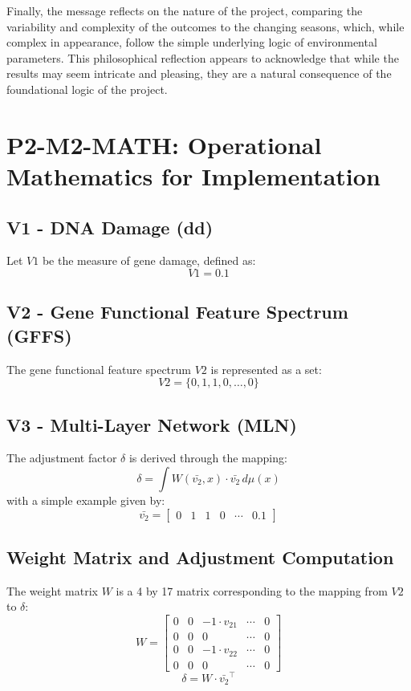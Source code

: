 \documentclass{article}
\begin{document}
Finally, the message reflects on the nature of the project, comparing the variability and complexity of the outcomes to the changing seasons, which, while complex in appearance, follow the simple underlying logic of environmental parameters. This philosophical reflection appears to acknowledge that while the results may seem intricate and pleasing, they are a natural consequence of the foundational logic of the project.



\section*{P2-M2-MATH: Operational Mathematics for Implementation}

\subsection*{V1 - DNA Damage (dd)}
Let $V1$ be the measure of gene damage, defined as:
\begin{equation}
V1 = 0.1
\end{equation}

\subsection*{V2 - Gene Functional Feature Spectrum (GFFS)}
The gene functional feature spectrum $V2$ is represented as a set:
\begin{equation}
V2 = \{0,1, 1,0, \ldots, 0\}
\end{equation}

\subsection*{V3 - Multi-Layer Network (MLN)}
The adjustment factor $\delta$ is derived through the mapping:
\begin{equation}
\delta = \int W(\bar{v_2},x) \cdot \bar{v_2} \, d\mu(x)
\end{equation}
with a simple example given by:
\begin{equation}
\bar{v_2} = 
\begin{bmatrix}
0 & 1 & 1 & 0 & \cdots & 0.1
\end{bmatrix}
\end{equation}

\subsection*{Weight Matrix and Adjustment Computation}
The weight matrix $W$ is a 4 by 17 matrix corresponding to the mapping from $V2$ to $\delta$:
\begin{equation}
W = 
\begin{bmatrix}
0 & 0 & -1 \cdot v_{21} & \cdots & 0 \\
0 & 0 & 0 & \cdots & 0 \\
0 & 0 & -1 \cdot v_{22} & \cdots & 0 \\
0 & 0 & 0 & \cdots & 0
\end{bmatrix}
\end{equation}
\begin{equation}
\delta = W \cdot \bar{v_2}^\top
\end{equation}
\end{document}
